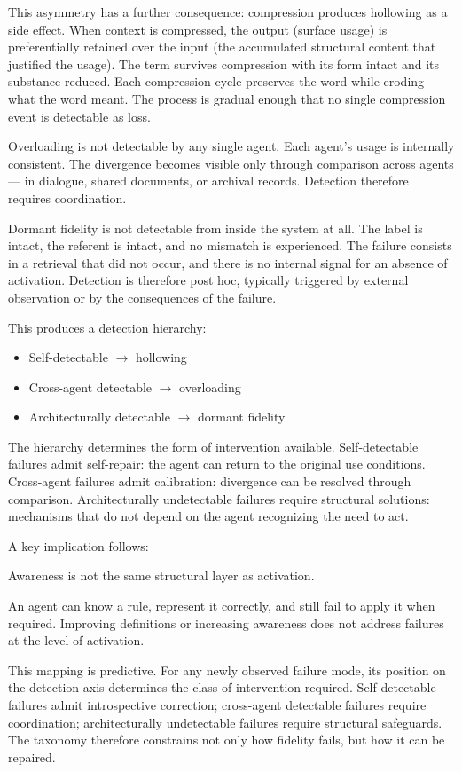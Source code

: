 \documentclass[11pt]{article}
\begin{document}
This asymmetry has a further consequence: compression produces hollowing as a side effect. When context is compressed, the output (surface usage) is preferentially retained over the input (the accumulated structural content that justified the usage). The term survives compression with its form intact and its substance reduced. Each compression cycle preserves the word while eroding what the word meant. The process is gradual enough that no single compression event is detectable as loss.

Overloading is not detectable by any single agent. Each agent’s usage is internally consistent. The divergence becomes visible only through comparison across agents — in dialogue, shared documents, or archival records. Detection therefore requires coordination.

Dormant fidelity is not detectable from inside the system at all. The label is intact, the referent is intact, and no mismatch is experienced. The failure consists in a retrieval that did not occur, and there is no internal signal for an absence of activation. Detection is therefore post hoc, typically triggered by external observation or by the consequences of the failure.

This produces a detection hierarchy:

\begin{itemize}
\item Self-detectable $\rightarrow$ hollowing
\item Cross-agent detectable $\rightarrow$ overloading
\item Architecturally detectable $\rightarrow$ dormant fidelity
\end{itemize}

The hierarchy determines the form of intervention available. Self-detectable failures admit self-repair: the agent can return to the original use conditions. Cross-agent failures admit calibration: divergence can be resolved through comparison. Architecturally undetectable failures require structural solutions: mechanisms that do not depend on the agent recognizing the need to act.

A key implication follows:

Awareness is not the same structural layer as activation.

An agent can know a rule, represent it correctly, and still fail to apply it when required. Improving definitions or increasing awareness does not address failures at the level of activation.

This mapping is predictive. For any newly observed failure mode, its position on the detection axis determines the class of intervention required. Self-detectable failures admit introspective correction; cross-agent detectable failures require coordination; architecturally undetectable failures require structural safeguards. The taxonomy therefore constrains not only how fidelity fails, but how it can be repaired.
\end{document}
